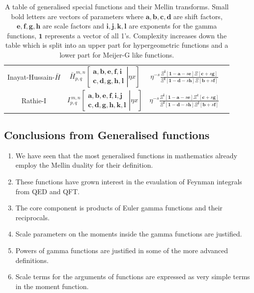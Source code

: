 \documentclass{article}
\begin{document}
\begin{table}
\begin{tabular}{|c|c|c|c|}
Inayat-Hussain-$\bar{H}$  & $\bar{H}_{p,q}^{\,m,n} \!\left[\left. \begin{matrix}
\mathbf{a},\mathbf{b},\mathbf{e,f,i} \\
\mathbf{c},\mathbf{d},\mathbf{g,h,l} \end{matrix} \right| \eta x \right]$ & $\eta^{-s}\frac{\Xi^{\mathbf{i}}[\mathbf{1-a}-s\mathbf{e}]\Xi[\mathbf{c}+s\mathbf{g}]}{\Xi^{\mathbf{l}}[\mathbf{1-d}-s\mathbf{h}] \Xi[\mathbf{b} + s \mathbf{f}]}$ & \citep{InayatHussain}\\
Rathie-I & $I_{p,q}^{\,m,n} \!\left[\left. \begin{matrix}
\mathbf{a},\mathbf{b},\mathbf{e,f,i,j} \\
\mathbf{c},\mathbf{d},\mathbf{g,h,k,l} \end{matrix} \right| \eta x \right]$ & $\eta^{-s}\frac{\Xi^{\mathbf{i}}[\mathbf{1-a}-s\mathbf{e}]\Xi^{k}[\mathbf{c}+s\mathbf{g}]}{\Xi^{\mathbf{l}}[\mathbf{1-d}-s\mathbf{h}] \Xi^{\mathbf{j}}[\mathbf{b} + s \mathbf{f}]}$ & \citep{Rathie1997}\\
\hline
\end{tabular}
\caption{A table of generalised special functions and their Mellin transforms. Small bold letters are vectors of parameters where $\mathbf{a,b,c,d}$ are shift factors, $\mathbf{e,f,g,h}$ are scale factors and $\mathbf{i,j,k,l}$ are exponents for the gamma functions, $\mathbf{1}$ represents a vector of all 1's. Complexity increases down the table which is split into an upper part for hypergeometric functions and a lower part for Meijer-G like functions.}
\end{table}


\subsection{Conclusions from Generalised functions}
\begin{enumerate}
\item We have seen that the most generalised functions in mathematics already employ the Mellin duality for their definition.
\item These functions have grown interest in the evaulation of Feynman integrals from QED and QFT.
\item The core component is products of Euler gamma functions and their reciprocals.
\item Scale parameters on the moments inside the gamma functions are justified.
\item Powers of gamma functions are justified in some of the more advanced definitions.
\item Scale terms for the arguments of functions are expressed as very simple terms in the moment function.
\end{enumerate}
\end{document}
